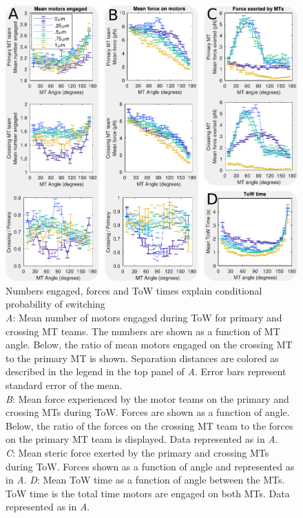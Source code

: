 \begin{figure}
\centering
\includegraphics[width=6.5in]{appendix1/forces}
\caption[Numbers engaged, forces and ToW times explain conditional probability of switching]{Numbers engaged, forces and ToW times explain conditional probability of switching\\
\textit{A}: Mean number of motors engaged during ToW for primary and crossing MT teams. The numbers are shown as a function of MT angle. Below, the ratio of mean motors engaged on the crossing MT to the primary MT is shown. Separation distances are colored as described in the legend in the top panel of \textit{A}. Error bars represent standard error of the mean. \\
\textit{B}: Mean force experienced by the motor teams on the primary and crossing MTs during ToW. Forces are shown as a function of angle. Below, the ratio of the forces on the crossing MT team to the forces on the primary MT team is displayed. Data represented as in \textit{A}.\\
\textit{C}: Mean steric force exerted by the primary and crossing MTs during ToW. Forces shown as a function of angle and represented as in \textit{A}.
\textit{D}: Mean ToW time as a function of angle between the MTs. ToW time is the total time motors are engaged on both MTs. Data represented as in \textit{A}.}
\label{fig:ToW_forces}
\end{figure}

